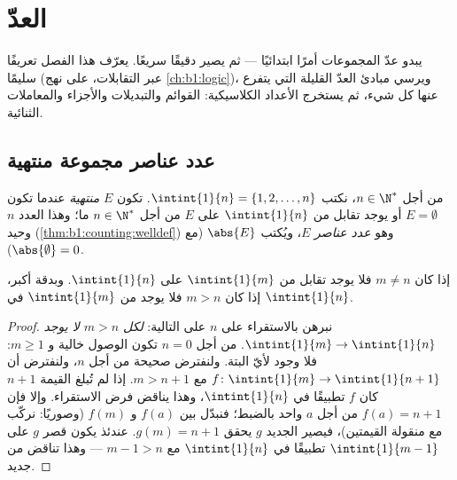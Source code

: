 \chapter{العدّ}\label{ch:b1:counting}

يبدو عدّ المجموعات  أمرًا ابتدائيًا --- ثم يصير دقيقًا سريعًا.
يعرّف هذا الفصل  تعريفًا سليمًا (عبر التقابلات، على نهج
\cref{ch:b1:logic})، ويرسي مبادئ العدّ القليلة التي يتفرع عنها
كل شيء، ثم يستخرج الأعداد الكلاسيكية: القوائم والتبديلات والأجزاء
والمعاملات الثنائية.

\section{عدد عناصر مجموعة منتهية}

\begin{definition}\label{def:b1:counting:card}
من أجل $n \in \N^*$، نكتب $\intint{1}{n} = \{1, 2, \dots,
n\}$. تكون  $E$ \emph{منتهية} عندما تكون
$E = \emptyset$ أو يوجد تقابل من $\intint{1}{n}$ على $E$
من أجل $n \in \N^*$ ما؛ وهذا العدد $n$ وحيد (\cref{thm:b1:counting:welldef})
وهو \emph{عدد عناصر} $E$، ويُكتب
$\abs{E}$ (مع $\abs{\emptyset} = 0$).
\end{definition}

\begin{theorem}\label{thm:b1:counting:welldef}
إذا كان $m \neq n$ فلا يوجد تقابل من $\intint{1}{m}$
على $\intint{1}{n}$. وبدقة أكبر، إذا كان $m > n$ فلا يوجد
 من $\intint{1}{m}$ في $\intint{1}{n}$.
\end{theorem}

\begin{proof}
نبرهن بالاستقراء على $n$ على  التالية: \emph{لكل $m > n$
لا يوجد  $\intint{1}{m} \to \intint{1}{n}$}. من أجل $n = 0$ تكون  الوصول خالية و $m \geq 1$: فلا
وجود لأيّ  البتة. ولنفترض  صحيحة من أجل $n$، ولنفترض أن $f \colon
\intint{1}{m} \to \intint{1}{n+1}$  مع $m > n + 1$. إذا لم تُبلغ القيمة $n + 1$ كان $f$
تطبيقًا  في $\intint{1}{n}$، وهذا يناقض فرض
الاستقراء. وإلا فإن $f(a) = n + 1$ من أجل $a$ واحد بالضبط؛
فنبدّل بين $f(a)$ و $f(m)$ (وصوريًا: نركّب مع منقولة
القيمتين)، فيصير  الجديد $g$ يحقق $g(m) = n + 1$.
عندئذ يكون قصر $g$ على $\intint{1}{m-1}$ تطبيقًا
 في $\intint{1}{n}$ مع $m - 1 > n$ ---
وهذا تناقض من جديد.
\end{proof}

